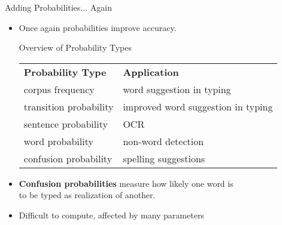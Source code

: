 \documentclass[professionalfonts, xcolor={usenames,svgnames,x11names,table}]{beamer}
\begin{document}
\begin{frame}{Adding Probabilities$\ldots$ Again}
    \begin{itemize}
        \item Once again probabilities improve accuracy.
            \begin{block}{Overview of Probability Types}
                \centering
                \begin{tabular}{ll}
                    \textbf{Probability Type} & \textbf{Application}\\
                    corpus frequency & word suggestion in typing\\
                    transition probability & improved word suggestion in typing\\
                    sentence probability & OCR\\
                    word probability & non-word detection\\
                    confusion probability & spelling suggestions\\
                \end{tabular}
            \end{block}
        \item \textbf{Confusion probabilities} measure how likely one word is\\
            to be typed as realization of another.
        \item Difficult to compute, affected by many parameters\\
    \end{itemize}
\end{frame}
\end{document}
